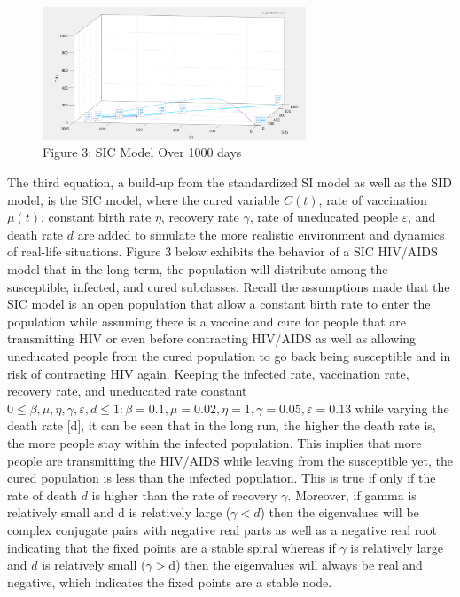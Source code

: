 \documentclass[a4paper, final, 12pt]{article}
\numberwithin{equation}{section}
\newcommand{\eps}{\varepsilon}
\renewcommand{\d}{\mathrm{d}}
\begin{document}
\begin{figure}[!ht] 
    \centering
    \includegraphics[width=0.7\textwidth]{model2.png}
    \caption{Figure 3: SIC Model Over 1000 days}
    \label{fig:matrix3}
\end{figure}

The third equation, a build-up from the standardized SI model as well as the SID model, is the SIC model, where the cured variable $C(t)$, rate of vaccination $\mu(t)$, constant birth rate $\eta$, recovery rate $\gamma$, rate of uneducated people $\eps$, and death rate $d$ are added to simulate the more realistic environment and dynamics of real-life situations. Figure 3 below exhibits the behavior of a SIC HIV/AIDS model that in the long term, the population will distribute among the susceptible, infected, and cured subclasses. Recall the assumptions made that the SIC model is an open population that allow a constant birth rate to enter the population while assuming there is a vaccine and cure for people that are transmitting HIV or even before contracting HIV/AIDS as well as allowing uneducated people from the cured population to go back being susceptible and in risk of contracting HIV again. Keeping the infected rate, vaccination rate, recovery rate, and uneducated rate constant ${0 \leq \beta, \mu, \eta, \gamma, \eps, d \leq 1: \beta = 0.1, \mu = 0.02, \eta = 1, \gamma = 0.05, \eps = 0.13}$ while varying the death rate [d], it can be seen that in the long run, the higher the death rate is, the more people stay within the infected population. This implies that more people are transmitting the HIV/AIDS while leaving from the susceptible yet, the cured population is less than the infected population. This is true if only if the rate of death $d$ is higher than the rate of recovery $\gamma$. Moreover, if gamma is relatively small and d is relatively large ($\gamma < d$) then the eigenvalues will be complex conjugate pairs with negative real parts as well as a negative real root indicating that the fixed points are a stable spiral whereas if $\gamma$ is relatively large and $d$ is relatively small ($\gamma > \d$) then the eigenvalues will always be real and negative, which indicates the fixed points are a stable node. \\
\end{document}
